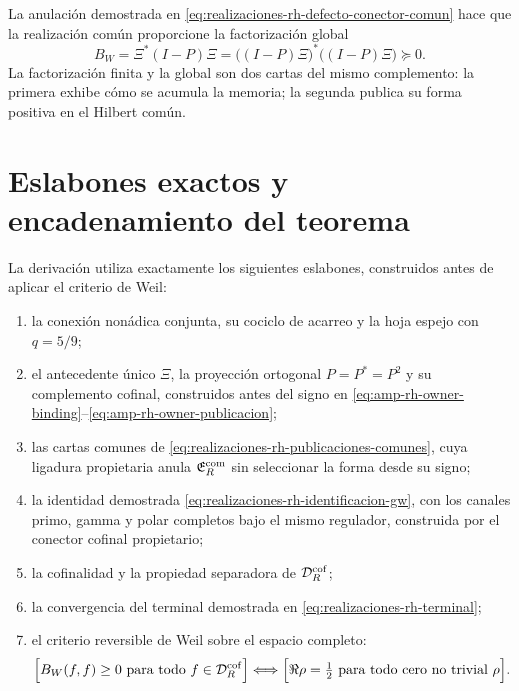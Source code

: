 La anulación demostrada en
\eqref{eq:realizaciones-rh-defecto-conector-comun} hace que la realización
común proporcione la factorización global
\begin{equation}\label{eq:realizaciones-rh-factorizacion-global}
 B_W=\Xi^*(I-P)\Xi
 =\bigl((I-P)\Xi\bigr)^*\bigl((I-P)\Xi\bigr)\succeq0.
\end{equation}
La factorización finita y la global son dos cartas del mismo complemento:
la primera exhibe cómo se acumula la memoria; la segunda publica su forma
positiva en el Hilbert común.

\section*{Eslabones exactos y encadenamiento del teorema}

La derivación utiliza exactamente los siguientes eslabones, construidos
antes de aplicar el criterio de Weil:
\begin{enumerate}
 \item la conexión nonádica conjunta, su cociclo de acarreo y la hoja espejo
       con \(q=5/9\);
 \item el antecedente único \(\Xi\), la proyección ortogonal
       \(P=P^*=P^2\) y su complemento cofinal, construidos antes del signo
       en \eqref{eq:amp-rh-owner-binding}--\eqref{eq:amp-rh-owner-publicacion};
 \item las cartas comunes de
       \eqref{eq:realizaciones-rh-publicaciones-comunes}, cuya ligadura
       propietaria anula \(\mathfrak E_R^{\rm com}\) sin seleccionar la
       forma desde su signo;
 \item la identidad demostrada
       \eqref{eq:realizaciones-rh-identificacion-gw}, con los canales primo,
       gamma y polar completos bajo el mismo regulador, construida por el
       conector cofinal propietario;
 \item la cofinalidad y la propiedad separadora de
       \(\mathcal D_R^{\rm cof}\);
 \item la convergencia del terminal demostrada en
       \eqref{eq:realizaciones-rh-terminal};
 \item el criterio reversible de Weil sobre el espacio completo:
 \begin{equation}\label{eq:realizaciones-rh-criterio}
  \Bigl[B_W(f,f)\geq0
  \ \text{para todo }f\in\mathcal D_R^{\rm cof}\Bigr]
  \Longleftrightarrow
  \Bigl[\Re\rho=\tfrac12
  \ \text{para todo cero no trivial }\rho\Bigr].
 \end{equation}
\end{enumerate}

